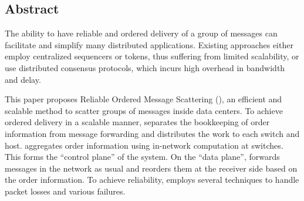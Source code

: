 \subsection*{Abstract}

The ability to have reliable and ordered delivery of a group of messages can facilitate and simplify many distributed applications.
Existing approaches either employ centralized sequencers or tokens, thus suffering from limited scalability, or use distributed consensus protocols, which incurs high overhead in bandwidth and delay.


This paper proposes Reliable Ordered Message Scattering (\sys), an efficient and scalable method to scatter groups of messages inside data centers. To achieve ordered delivery in a scalable manner, \sys separates the bookkeeping of order information from message forwarding and distributes the work to each switch and host. \sys aggregates order information using in-network computation at switches. This forms the ``control plane'' of the system. On the ``data plane'', \sys forwards messages in the network as usual and reorders them at the receiver side based on the order information. To achieve reliability, \sys employs several techniques  to handle packet losses and various failures.



